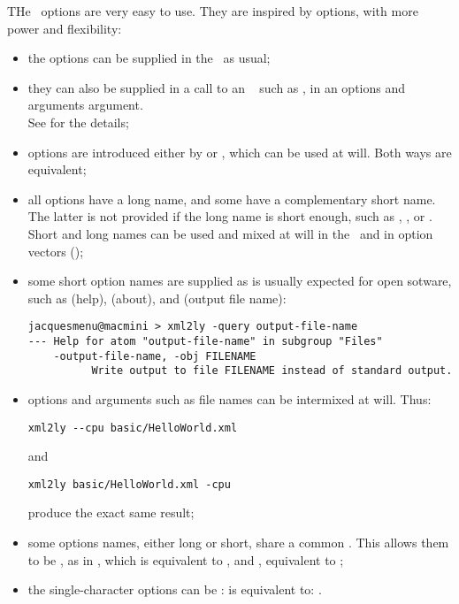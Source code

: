 THe \oahRepr\ options are very easy to use. They are inspired by  options, with more power and flexibility:
\begin{itemize}
\item the options can be supplied in the \CLI\ as usual;

  \item they can also be supplied in a call to an \API\  such as , in an options and arguments argument. \\
    		See  for the details;

\item options are introduced either by \code{-} or \code{--}, which can be used at will. Both ways are equivalent;

\item all options have a long name, and some have a complementary short name.
 The latter is not provided if the long name is short enough, such as , ,  or .\\
    Short and long names can be used and mixed at will in the \CLI\ and in option vectors (\API);

\item some short option names are supplied as is usually expected for open sotware, such as  (help),  (about), and  (output file name):
\begin{lstlisting}[language=Terminal]
jacquesmenu@macmini > xml2ly -query output-file-name
--- Help for atom "output-file-name" in subgroup "Files"
    -output-file-name, -obj FILENAME
          Write output to file FILENAME instead of standard output.
\end{lstlisting}

\item options and arguments such as file names can be intermixed at will. Thus:
\begin{lstlisting}[language=Terminal]
xml2ly --cpu basic/HelloWorld.xml
\end{lstlisting}
and
\begin{lstlisting}[language=Terminal]
xml2ly basic/HelloWorld.xml -cpu
\end{lstlisting}

produce the exact same result;

\item some options names, either long or short, share a common . This allows them to be , as in , which is equivalent to , and , equivalent to ;

\item the single-character options can be :  is equivalent to: .

\end{itemize}



